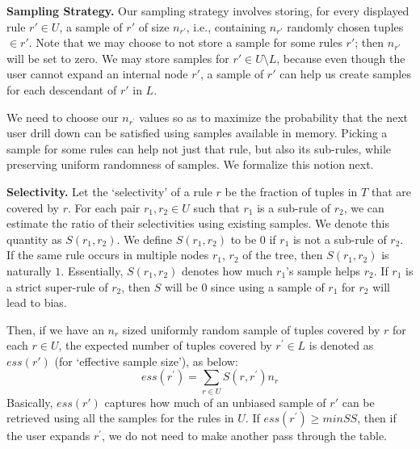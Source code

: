 \documentclass[10pt,journal,compsoc]{IEEEtran}
\newcounter{prob}
\newcommand{\stitle}[1]{\vspace{0.5em}\noindent\textbf{#1}}
\begin{document}
{\stitle{Sampling Strategy.} Our sampling strategy involves storing, 
for every displayed rule $r' \in U$, a sample of $r'$ of size $n_{r'}$, i.e., 
containing $n_{r'}$ randomly chosen tuples $\in r'$.
Note that we may choose to not store a sample for some rules $r'$; then $n_{r'}$ will be set to zero. We may store samples for $r' \in U \setminus L$, because even though the user cannot expand an internal node $r'$, a sample of $r'$ can help us create samples for each descendant of $r'$ in $L$.

We need to choose our $n_{r^{\prime}}$ values so as to maximize the probability that the next user drill down can be satisfied using samples available in memory. Picking a sample for some rules can help not just that rule, but
also its sub-rules, while preserving uniform randomness of samples. We formalize this notion next.


\stitle{Selectivity.} 
Let the `selectivity' of a rule $r$ be the fraction of tuples in $T$ that are covered by $r$. 
For each pair $r_1, r_2 \in U$ such that $r_1$ is a sub-rule of $r_2$, we can estimate the ratio of their selectivities using existing samples. We denote this quantity as $S(r_1, r_2)$. 
We define $S(r_1, r_2)$ to be $0$ if $r_1$ is not a sub-rule of $r_2$. 
If the same rule occurs in multiple nodes $r_1$, $r_2$ of the tree, then $S(r_1, r_2)$ is naturally $1$. 
Essentially, $S(r_1, r_2)$ denotes how much $r_1$'s sample helps $r_2$. 
If $r_1$ is a strict super-rule of $r_2$, then $S$ will be $0$ since using a sample of $r_1$
for $r_2$ will lead to bias.

Then, if we have an $n_r$ sized uniformly random sample of tuples covered by $r$ for each $r \in U$, the expected number of tuples covered by $r^{\prime} \in L$ is denoted as $ess(r')$ (for `effective sample size'), as below: 
\begin{equation} \label{def:ess}
ess(r^{\prime}) = \sum_{r \in U} S(r, r^{\prime})n_r
\end{equation}
Basically, $ess(r')$ captures how much of an unbiased sample of $r'$ can be retrieved using all the samples for the rules in $U$.
If $ess(r^{\prime}) \geq minSS$, then if the user expands $r^{\prime}$, we do not need to make another 
pass through the table.

}
\end{document}
